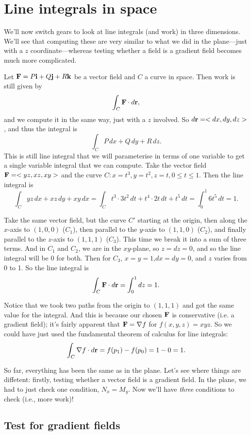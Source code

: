 \section{Line integrals in space}

We'll now switch gears to look at line integrals (and work) in three dimensions. We'll see that computing these are very similar to what we did in the plane---just with a $z$ coordinate---whereas testing whether a field is a gradient field becomes much more complicated.

Let $\boldsymbol{\mathbf{F}} = P\boldsymbol{\mathbf{i}} +Q\boldsymbol{\mathbf{j}} + R\boldsymbol{\mathbf{k}}$ be a vector field and $C$ a curve in space. Then work is still given by
\[ \int_C \boldsymbol{\mathbf{F}}\cdot d\boldsymbol{\mathbf{r}}, \]
and we compute it in the same way, just with a $z$ involved. So $d\boldsymbol{\mathbf{r}} = <dx,dy,dz>$, and thus the integral is
\[ \int_C P\,dx + Q\,dy +R\,dz. \]
This is still line integral that we will parameterise in terms of one variable to get a single variable integral that we can compute. 
\bex
Take the vector field $\boldsymbol{\mathbf{F}} = <yz,xz,xy>$ and the curve $C: x = t^3,y=t^2,z=t, 0\le t\le1$. Then the line integral is
\[ \int_C yz \,dx + xz\,dy + xy\,dx = \int_C t^3\cdot3t^2\,dt + t^4\cdot 2t\,dt + t^5 \,dt = \int_0^1 6t^5\,dt = 1. \]

Take the same vector field, but the curve $C'$ starting at the origin, then along the $x$-axis to $(1,0,0)$ ($C_1$), then parallel to the $y$-axis to $(1,1,0)$ ($C_2$), and finally parallel to the $z$-axis to $(1,1,1)$ ($C_3$). This time we break it into a sum of three terms. And in $C_1$ and $C_2$, we are in the $xy$-plane, so $z=dz=0$, and so the line integral will be 0 for both. Then for $C_3$, $x=y=1$,$dx=dy=0$, and $z$ varies from 0 to 1. So the line integral is
\[ \int_C \boldsymbol{\mathbf{F}} \cdot d\boldsymbol{\mathbf{r}} = \int_0^1 dz = 1. \]

Notice that we took two paths from the origin to $(1,1,1)$ and got the same value for the integral. And this is because our chosen $\boldsymbol{\mathbf{F}}$ is conservative (i.e. a gradient field); it's fairly apparent that $\boldsymbol{\mathbf{F}} = \nabla f$ for $f(x,y,z) =xyz$. So we could have just used the fundamental theorem of calculus for line integrals:
\[ \int_C \nabla f \cdot d\boldsymbol{\mathbf{r}} = f(p_1)-f(p_0) = 1 - 0 = 1. \]
\eex

So far, everything has been the same as in the plane. Let's see where things are diffetent: firstly, testing whether a vector field is a gradient field. In the plane, we had to just check one condition, $N_x = M_y$. Now we'll have \textit{three} conditions to check (i.e., more work)!

\subsection{Test for gradient fields}

